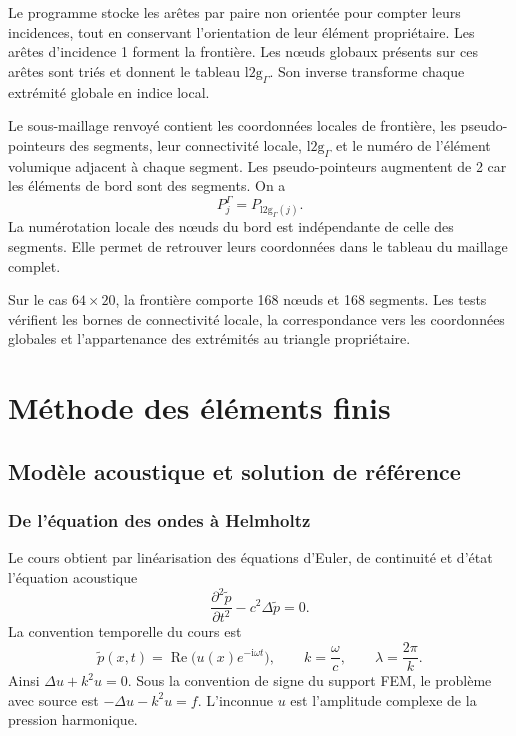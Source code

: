 \documentclass[12pt,a4paper]{article}
\newcommand{\ii}{\mathrm{i}}
\begin{document}
Le programme stocke les arêtes par paire non orientée pour compter leurs incidences, tout en conservant l'orientation de leur élément propriétaire. Les arêtes d'incidence 1 forment la frontière. Les nœuds globaux présents sur ces arêtes sont triés et donnent le tableau $\mathrm{l2g}_\Gamma$. Son inverse transforme chaque extrémité globale en indice local.

Le sous-maillage renvoyé contient les coordonnées locales de frontière, les pseudo-pointeurs des segments, leur connectivité locale, $\mathrm{l2g}_\Gamma$ et le numéro de l'élément volumique adjacent à chaque segment. Les pseudo-pointeurs augmentent de 2 car les éléments de bord sont des segments. On a
\begin{equation*}
P^\Gamma_j=P_{\mathrm{l2g}_\Gamma(j)}.
\end{equation*}
La numérotation locale des nœuds du bord est indépendante de celle des segments. Elle permet de retrouver leurs coordonnées dans le tableau du maillage complet.

Sur le cas $64\times20$, la frontière comporte 168 nœuds et 168 segments. Les tests vérifient les bornes de connectivité locale, la correspondance vers les coordonnées globales et l'appartenance des extrémités au triangle propriétaire.

\par
\section{Méthode des éléments finis}
\subsection{Modèle acoustique et solution de référence}
\subsubsection{De l'équation des ondes à Helmholtz}
Le cours \cite{model} obtient par linéarisation des équations d'Euler, de continuité et d'état l'équation acoustique
\begin{equation*}
\frac{\partial^2\widetilde p}{\partial t^2}-c^2\Delta\widetilde p=0.
\end{equation*}
La convention temporelle du cours \cite{model} est
\begin{equation*}
\widetilde p(x,t)=\operatorname{Re}\bigl(u(x)e^{-\ii\omega t}\bigr),\qquad
k=\frac{\omega}{c},\qquad \lambda=\frac{2\pi}{k}.
\end{equation*}
Ainsi $\Delta u+k^2u=0$. Sous la convention de signe du support FEM, le problème avec source est $-\Delta u-k^2u=f$. L'inconnue $u$ est l'amplitude complexe de la pression harmonique.
\end{document}
